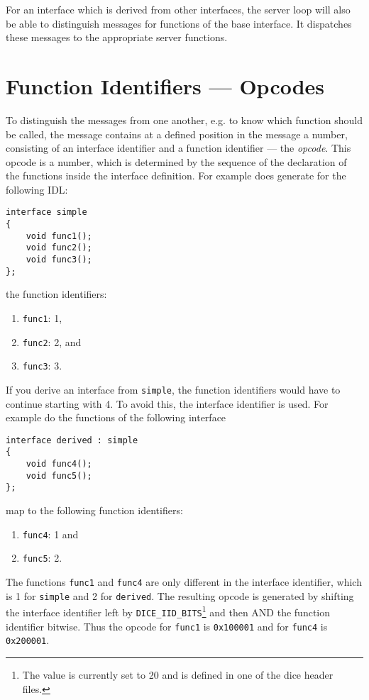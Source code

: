 For an interface which is derived from other interfaces, the
server loop will also be able to distinguish messages for functions
of the base interface. It dispatches these messages to the appropriate
server functions.

\section{Function Identifiers --- Opcodes}
\label{sec:opcode}
To distinguish the messages from one another, e.g. to know which function
should be called, the message contains at a defined position in the message a
number, consisting of an interface identifier and a function identifier ---
the {\em opcode}. This opcode is a number, which is determined by the sequence
of the declaration of the functions inside the interface definition. For
example does \dice{} generate for the following IDL:

\begin{verbatim}
interface simple
{
    void func1();
    void func2();
    void func3();
};
\end{verbatim}

the function identifiers:

\begin{enumerate}
\item \verb|func1|: 1,
\item \verb|func2|: 2, and
\item \verb|func3|: 3.
\end{enumerate}

If you derive an interface from \verb|simple|, the function identifiers
would have to continue starting with 4. To avoid this, the interface identifier
is used. For example do the functions of the following interface

\begin{verbatim}
interface derived : simple
{
    void func4();
    void func5();
};
\end{verbatim}

map to the following function identifiers:

\begin{enumerate}
\item \verb|func4|: 1 and
\item \verb|func5|: 2.
\end{enumerate}

The functions \verb|func1| and \verb|func4| are only different in the
interface identifier, which is 1 for \verb|simple| and 2 for
\verb|derived|. The resulting opcode is generated by shifting the
interface identifier left by \verb|DICE_IID_BITS|\footnote{The value
is currently set to 20 and is defined in one of the dice header files.}
and then AND the function identifier bitwise. Thus the opcode for
\verb|func1| is \verb|0x100001| and for \verb|func4| is \verb|0x200001|.

